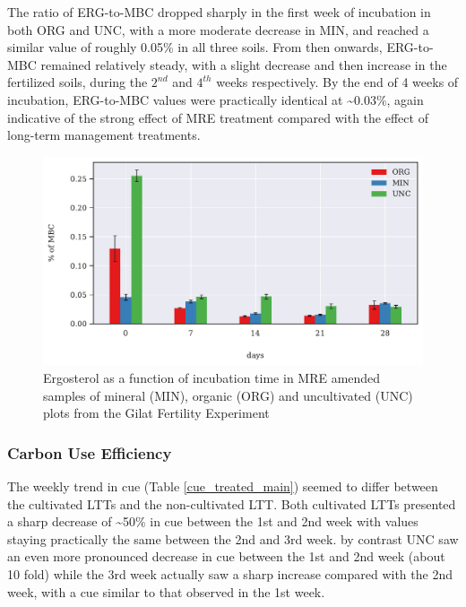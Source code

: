 			The ratio of ERG-to-MBC dropped sharply in the first week of incubation in both ORG and UNC, with a more moderate decrease in 	MIN, and reached a similar value of  roughly 0.05\% in all three soils. From then onwards, ERG-to-MBC remained relatively steady, with a slight decrease and then increase in the fertilized soils, during the $2^{nd}$ and $ 4^{th} $ weeks respectively. By the end of 4 weeks of incubation,  ERG-to-MBC values were practically identical at \~{}0.03\%, again indicative of the strong effect of MRE treatment compared with the effect of long-term management treatments.

			\begin{figure}[H]

				\centering
				\includegraphics[scale=0.8, width=\linewidth]{thesis_figures/main_incubation/MRE_treated/Erg-to-MBC.pdf}
				\caption{Ergosterol as a function of incubation time in MRE amended samples of mineral (MIN), organic (ORG) and uncultivated (UNC) plots from the Gilat Fertility Experiment}
				\label{fig:erg_treated_main}
			\end{figure}

		\vspace{5cm}

		\subsubsection{Carbon Use Efficiency}
		The weekly trend in \gls{cue} (Table \ref{cue_treated_main}) seemed to differ between the cultivated LTTs and the non-cultivated LTT. Both cultivated LTTs presented a sharp decrease of \~{}50\% in \gls{cue} between the 1st and 2nd week with values staying practically the same between the 2nd and 3rd week. by contrast UNC saw an even more pronounced decrease in \gls{cue} between the 1st and 2nd week (about 10 fold) while the 3rd week actually saw a sharp increase compared with the 2nd week, with a \gls{cue} similar to that observed in the 1st week.


